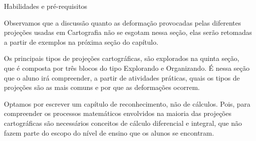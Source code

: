 \begin{apresentacao}{Habilidades e pré-requisitos}
{Observamos que a discussão quanto as deformação provocadas pelas diferentes projeções usadas em Cartografia não se esgotam nessa seção, elas serão retomadas a partir de exemplos na próxima seção do capítulo.

Os principais tipos de projeções cartográficas, são explorados na quinta seção, que é composta por três blocos do tipo Explorando e Organizando. É nessa seção que o aluno irá compreender, a partir de atividades práticas, quais os tipos de projeções são as mais comuns e por que as deformações ocorrem.

Optamos por escrever um capítulo de reconhecimento, não de cálculos. Pois, para compreender os processos matemáticos envolvidos na maioria das projeções cartográficas são necessários conceitos de cálculo diferencial e integral, que não fazem parte do escopo do nível de ensino que os alunos se encontram.

}
\end{apresentacao}

